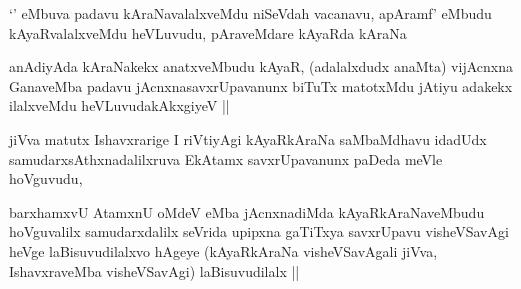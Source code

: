 \begin{artha}
`\stext' eMbuva padavu kAraNavalalxveMdu niSeVdah vacanavu, apAramf' eMbudu kAyaRvalalxveMdu heVLuvudu, pAraveMdare kAyaRda kAraNa
\end{artha}


\begin{artha}
anAdiyAda kAraNakekx anatxveMbudu kAyaR, (adalalxdudx anaMta) vijAcnxna GanaveMba padavu jAcnxnasavxrUpavanunx biTuTx matotxMdu jAtiyu adakekx ilalxveMdu heVLuvudakAkxgiyeV ||
\end{artha}

\begin{artha}
jiVva matutx Ishavxrarige I riVtiyAgi kAyaRkAraNa saMbaMdhavu idadUdx samudarxsAthxnadalilxruva EkAtamx savxrUpavanunx paDeda meVle hoVguvudu,
\end{artha}

\begin{artha}
barxhamxvU AtamxnU oMdeV eMba jAcnxnadiMda kAyaRkAraNaveMbudu hoVguvalilx samudarxdalilx seVrida upipxna gaTiTxya savxrUpavu visheVSavAgi heVge laBisuvudilalxvo hAgeye (kAyaRkAraNa visheVSavAgali jiVva, IshavxraveMba visheVSavAgi) laBisuvudilalx ||
\end{artha}





